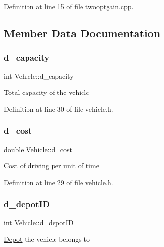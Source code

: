Definition at line 15 of file twooptgain.\+cpp.



\subsection{Member Data Documentation}
\mbox{\label{class_vehicle_aaa97b9878e02637eaddc2ff6510e45b2}} 
\subsubsection{\texorpdfstring{d\+\_\+capacity}{d\_capacity}}
{\footnotesize\ttfamily int Vehicle\+::d\+\_\+capacity\hspace{0.3cm}{\ttfamily [private]}}

Total capacity of the vehicle 

Definition at line 30 of file vehicle.\+h.

\mbox{\label{class_vehicle_a62e678a6dec05635fc5f87f5a3a239f3}} 
\subsubsection{\texorpdfstring{d\+\_\+cost}{d\_cost}}
{\footnotesize\ttfamily double Vehicle\+::d\+\_\+cost\hspace{0.3cm}{\ttfamily [private]}}

Cost of driving per unit of time 

Definition at line 29 of file vehicle.\+h.

\mbox{\label{class_vehicle_a6a86e014f7441ef89165c7e5ce47c1b5}} 
\subsubsection{\texorpdfstring{d\+\_\+depot\+ID}{d\_depotID}}
{\footnotesize\ttfamily int Vehicle\+::d\+\_\+depot\+ID\hspace{0.3cm}{\ttfamily [private]}}

\hyperlink{class_depot}{Depot} the vehicle belongs to 

